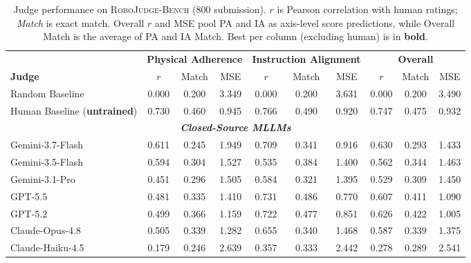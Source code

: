 \begin{table}[t]
\centering
\caption{Judge performance on \textsc{RoboJudge-Bench} (800 submission). $r$ is Pearson correlation with human ratings; \emph{Match} is exact match. Overall $r$ and MSE pool PA and IA as axis-level score predictions, while Overall Match is the average of PA and IA Match. Best per column (excluding human) is in \textbf{bold}.}
\label{tab:judge_performance}
\fontsize{7.2pt}{9pt}\selectfont
\setlength{\tabcolsep}{3pt}
\begin{tabular}{@{}l ccc ccc cc c@{}}
\hline
 & \multicolumn{3}{c}{\textbf{Physical Adherence}} & \multicolumn{3}{c}{\textbf{Instruction Alignment}} & \multicolumn{3}{c}{\textbf{Overall}} \\
\cmidrule(lr){2-4} \cmidrule(lr){5-7} \cmidrule(lr){8-10}
\textbf{Judge} & $r$ & Match & MSE & $r$ & Match & MSE & $r$ & Match & MSE \\
\midrule
Random Baseline
& 0.000 & 0.200 & 3.349
& 0.000 & 0.200 & 3.631
& 0.000 & 0.200 & 3.490 \\
\midrule
Human Baseline (\textbf{untrained})
& 0.730 & 0.460 & 0.945
& 0.766 & 0.490 & 0.920
& 0.747 & 0.475 & 0.932 \\
\midrule
\multicolumn{10}{c}{\textit{\textbf{Closed-Source MLLMs}}}\\
\midrule
Gemini-3.7-Flash~\cite{google2026gemini37flash}
& 0.611 & 0.245 & 1.949
& 0.709 & 0.341 & 0.916
& 0.630 & 0.293 & 1.433 \\

Gemini-3.5-Flash~\cite{google2026gemini35flash}
& 0.594 & 0.304 & 1.527
& 0.535 & 0.384 & 1.400
& 0.562 & 0.344 & 1.463 \\

Gemini-3.1-Pro~\cite{google2026gemini31pro}
& 0.451 & 0.296 & 1.505
& 0.584 & 0.321 & 1.395
& 0.529 & 0.309 & 1.450 \\

GPT-5.5~\cite{openai2026gpt55}
& 0.481 & 0.335 & 1.410
& 0.731 & 0.486 & 0.770
& 0.607 & 0.411 & 1.090 \\

GPT-5.2~\cite{openai2025gpt52}
& 0.499 & 0.366 & 1.159
& 0.722 & 0.477 & 0.851
& 0.626 & 0.422 & 1.005 \\

Claude-Opus-4.8~\cite{anthropic2026claudeopus48}
& 0.505 & 0.339 & 1.282
& 0.655 & 0.340 & 1.468
& 0.587 & 0.339 & 1.375 \\

Claude-Haiku-4.5~\cite{anthropic2025claudehaiku45}
& 0.179 & 0.246 & 2.639
& 0.357 & 0.333 & 2.442
& 0.278 & 0.289 & 2.541 \\


\end{tabular}
\end{table}
